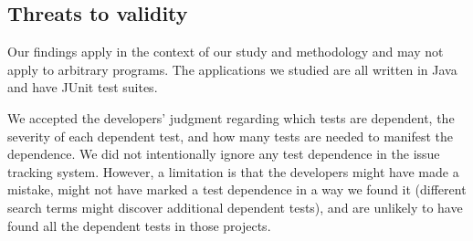 

\subsection{Threats to validity}

Our findings apply in the context of our study and methodology and may not
apply to arbitrary programs.
The applications we studied are all written in 
Java and have JUnit test suites.  

We accepted the developers' judgment regarding which tests are dependent,
the severity of each dependent test, and how many tests are needed
to manifest the dependence.  We did not intentionally ignore
any test dependence in the issue tracking system.
However, a limitation is that the developers might have made a mistake,
might not have marked a test dependence in a way we found it
(different search terms might discover additional dependent tests), and are
unlikely to have found all the dependent tests in those projects. 


